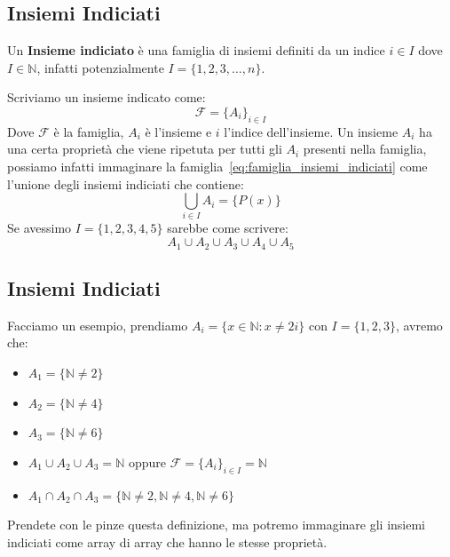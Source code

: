 \documentclass{article}
\theoremstyle{definition}
\begin{document}
\subsection{Insiemi Indiciati}\label{sec:insiemi_indiciati}
Un \textbf{Insieme indiciato} è una famiglia di insiemi definiti da un indice $i \in I$ dove $I \in \mathbb{N}$, infatti potenzialmente $I = \{1,2,3,\ldots,n\}$. \par
Scriviamo un insieme indicato come:
\begin{equation}\label{eq:famiglia_insiemi_indiciati}
        \mathcal{F} = {\{A_i\}}_{i \in I}
\end{equation} 
Dove $\mathcal{F}$ è la famiglia, $A_i$ è l'insieme e $i$ l'indice dell'insieme. \newline
Un insieme $A_i$ ha una certa proprietà che viene ripetuta per tutti gli $A_i$ presenti nella famiglia, possiamo infatti immaginare la famiglia~\ref{eq:famiglia_insiemi_indiciati} come l'unione degli insiemi indiciati che contiene:
\begin{equation*}
        \bigcup_{i \in I}A_i = \{P(x)\}
\end{equation*}
Se avessimo $I = \{1,2,3,4,5\}$ sarebbe come scrivere:
\begin{equation*}
        A_1 \cup A_2 \cup A_3 \cup A_4 \cup A_5
\end{equation*}



\subsection{Insiemi Indiciati}
Facciamo un esempio, prendiamo $A_i = \{x \in \mathbb{N} : x \not = 2i\}$ con $I = \{1,2,3\}$, avremo che:
\begin{itemize}
        \item $A_1 = \{\mathbb{N} \not = 2\}$
        \item $A_2 = \{\mathbb{N} \not = 4\}$
        \item $A_3 = \{\mathbb{N} \not = 6\}$
        \item $A_1 \cup A_2 \cup A_3 = \mathbb{N}$ oppure $\mathcal{F} = {\{A_i\}}_{i \in I} = \mathbb{N}$
        \item $A_1 \cap A_2 \cap A_3 = \{\mathbb{N} \not = 2, \mathbb{N} \not = 4, \mathbb{N} \not = 6\}$
\end{itemize}

Prendete con le pinze questa definizione, ma potremo immaginare gli insiemi indiciati come array di array che hanno le stesse proprietà.
\end{document}
